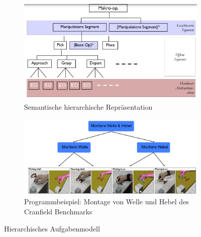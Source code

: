 \begin{figure}[h!]
	\centering
	\begin{subfigure}{.45\textwidth}
		\includegraphics[width=\textwidth]{figures/ch02_hier1.png}
		\caption{Semantische hierarchische Repräsentation}
	\end{subfigure}
	\begin{subfigure}{.45\textwidth}
		\includegraphics[width=\textwidth]{figures/ch02_hier2.png}
		\caption{Programmbeispiel: Montage von Welle und Hebel des Cranfield Benchmarks}
		\label{vg}
	\end{subfigure}
	\caption{Hierarchisches Aufgabenmodell}
	\label{vg1}
\end{figure}

